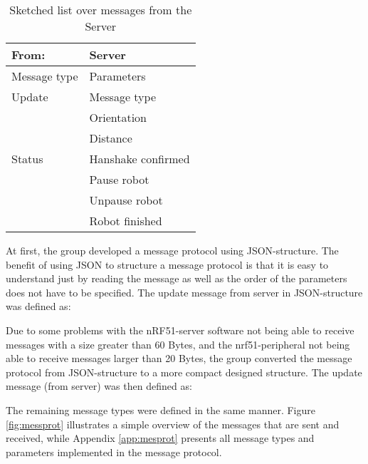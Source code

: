 \begin{table}[ht]
\begin{center}
 \begin{tabular}{|l | l|} 
 \hline
 From: & \textbf{Server}\\
 \hline
 \hline
 Message type       &    Parameters \\
 \hline

 Update              &   Message type \\
                    &   Orientation \\
                    &   Distance \\
 \hline
 Status                &   Hanshake confirmed \\
                    &   Pause robot \\
                    &   Unpause robot \\
                    &   Robot finished \\
 \hline
\end{tabular}
\end{center}
\caption{Sketched list over messages from the Server}
\label{tab:messprotfromser}
\end{table}

At first, the group developed a message protocol using JSON-structure. The benefit of using JSON to structure a message protocol is that it is easy to understand just by reading the message as well as the order of the parameters does not have to be specified. The update message from server in JSON-structure was defined as:


Due to some problems with the nRF51-server software not being able to receive messages with a size greater than 60 Bytes, and the nrf51-peripheral not being able to receive messages larger than 20 Bytes, the group converted the message protocol from JSON-structure to a more compact designed structure. The update message (from server) was then defined as:


The remaining message types were defined in the same manner. Figure \ref{fig:messprot} illustrates a simple overview of the messages that are sent and received, while Appendix \ref{app:mesprot} presents all message types and parameters implemented in the message protocol.


